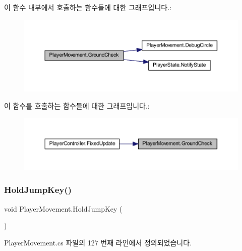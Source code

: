 이 함수 내부에서 호출하는 함수들에 대한 그래프입니다.\+:\nopagebreak
\begin{figure}[H]
\begin{center}
\leavevmode
\includegraphics[width=350pt]{d0/d3d/class_player_movement_a957f2e09268831052dbd00a9e8e4fa70_cgraph}
\end{center}
\end{figure}
이 함수를 호출하는 함수들에 대한 그래프입니다.\+:\nopagebreak
\begin{figure}[H]
\begin{center}
\leavevmode
\includegraphics[width=350pt]{d0/d3d/class_player_movement_a957f2e09268831052dbd00a9e8e4fa70_icgraph}
\end{center}
\end{figure}
\mbox{\label{class_player_movement_af1a6cc9394844b2ef84773900f315fb9}} 
\subsubsection{\texorpdfstring{HoldJumpKey()}{HoldJumpKey()}}
{\footnotesize\ttfamily void Player\+Movement.\+Hold\+Jump\+Key (\begin{DoxyParamCaption}{ }\end{DoxyParamCaption})}



Player\+Movement.\+cs 파일의 127 번째 라인에서 정의되었습니다.


